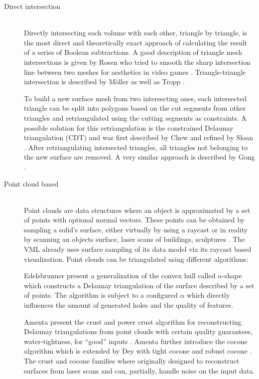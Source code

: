 \begin{description}
	
	\item[Direct intersection] \hfill \\
	Directly intersecting each volume with each other, triangle by triangle, is the most direct and theoretically exact approach of calculating the result of a series of Boolean subtractions.
	A good description of triangle mesh intersections is given by Rosen who tried to smooth the sharp intersection line between two meshes for aesthetics in video games \cite{mesh_intersection}.
	Triangle-triangle intersection is described by Möller \cite{tri_tri_intersection_moller} as well as Tropp \etal \cite{tri_tri_intersection_2}.
	
	To build a new surface mesh from two intersecting ones, each intersected triangle can be split into polygons based on the cut segments from other triangles and retriangulated using the cutting segments as constraints.
	A possible solution for this retriangulation is the constrained Delaunay triangulation (CDT) and was first described by Chew \cite{cdt} and refined by Sloan \cite{cdt_fast}.
	After retriangulating intersected triangles, all triangles not belonging to the new surface are removed.
	A very similar approach is described by Gong \cite{cutter_workpiece_engagement}.
	
	
	\item[Point cloud based] \hfill \\
	Point clouds are data structures where an object is approximated by a set of points with optional normal vectors.
	These points can be obtained \eg by sampling a solid's surface, either virtually by \eg using a raycast or in reality by scanning an objects surface, \eg laser scans of buildings, sculptures \etc.
	The VML already uses surface sampling of its data model via its raycast based visualization.
	Point clouds can be triangulated using different algorithms:
	
	Edelsbrunner \etal present a generalization of the convex hull called $\alpha$-shape \cite{alpha_shape} which constructs a Delaunay triangulation of the surface described by a set of points.
	The algorithm is subject to a configured $\alpha$ which directly influences the amount of generated holes and the quality of features.
	
	Amenta \etal present the crust and power crust algorithm for reconstructing Delaunay triangulations from point clouds with certain quality guarantees, \eg water-tightness, for \enquote{good} inputs \cite{crust, power_crust}.
	Amenta \etal further introduce the cocone algorithm \cite{cocone} which is extended by Dey \etal with tight cocone and robust cocone \cite{tight_cocone, robust_cocone}.
	The crust and cocone families where originally designed to reconstruct surfaces from laser scans and can, partially, handle noise on the input data.
	

\end{description}
